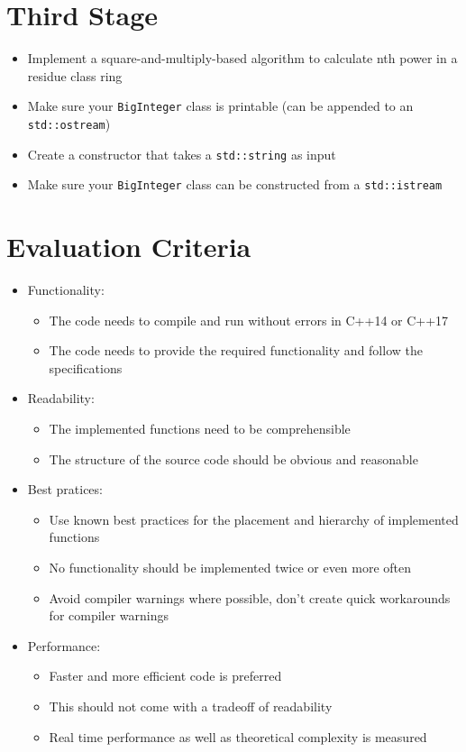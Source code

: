 \documentclass[12pt, a4paper]{article}
\begin{document}
\section*{Third Stage}
\begin{itemize}
    \item Implement a square-and-multiply-based algorithm to calculate nth power in a residue class ring
    \item Make sure your \lstinline{BigInteger} class is printable (can be appended to an \lstinline{std::ostream})
    \item Create a constructor that takes a \lstinline{std::string} as input
    \item Make sure your \lstinline{BigInteger} class can be constructed from a \lstinline{std::istream}
\end{itemize}
\section*{Evaluation Criteria}
\begin{itemize}
    \item Functionality:
    \begin{itemize}
        \item The code needs to compile and run without errors in C++14 or C++17
        \item The code needs to provide the required functionality and follow the specifications
    \end{itemize}
    \item Readability:
    \begin{itemize}
        \item The implemented functions need to be comprehensible
        \item The structure of the source code should be obvious and reasonable
    \end{itemize}
    \item Best pratices:
    \begin{itemize}
        \item Use known best practices for the placement and hierarchy of implemented functions
        \item No functionality should be implemented twice or even more often
        \item Avoid compiler warnings where possible, don't create quick workarounds for compiler warnings
    \end{itemize}
    \item Performance:
    \begin{itemize}
        \item Faster and more efficient code is preferred
        \item This should not come with a tradeoff of readability
        \item Real time performance as well as theoretical complexity is measured
    \end{itemize}
\end{itemize}
\end{document}
